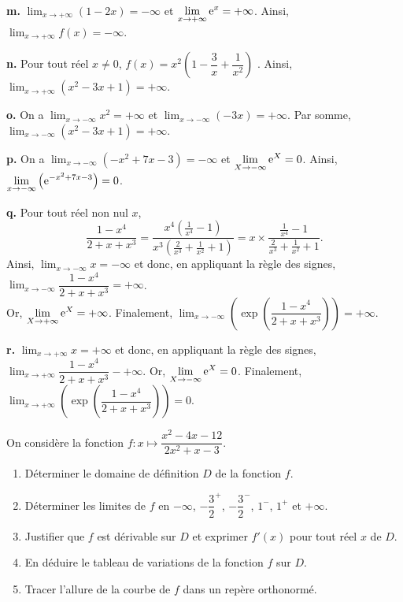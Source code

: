 \documentclass[11pt,fleqn, openany]{book} %
\begin{document}
\begin{solution}
\textbf{m.} $\displaystyle \lim_{x \to +\infty}(1-2x)=-\infty$ et $\displaystyle \lim_{x \to +\infty} \mathrm{e}^x =+\infty$. Ainsi, $\displaystyle \lim_{x \to +\infty} f(x)=-\infty$.

\textbf{n.} Pour tout réel $x\neq 0$, $f(x)=x^2\left(1-\dfrac{3}{x}+\dfrac{1}{x^2}\right)$ . Ainsi, $\displaystyle \lim_{x \to +\infty} \left( x^2-3x+1\right)=+\infty$.

\textbf{o.} On a $\displaystyle\lim_{x \to -\infty}x^2=+\infty$ et $\displaystyle\lim_{x \to -\infty}(-3x)=+\infty$. Par somme, $\displaystyle \lim_{x \to -\infty} \left( x^2-3x+1\right)=+\infty$.

\textbf{p.} On a $\displaystyle \lim_{x \to -\infty} (-x^2+7x-3)=-\infty$ et $\displaystyle \lim_{X \to -\infty} \mathrm{e}^X=0$. Ainsi, $\displaystyle \lim_{x \to -\infty}\left( \mathrm{e}^{-x^2+7x-3}\right)=0$.

\textbf{q.} Pour tout réel non nul $x$, 
\[\dfrac{1-x^4}{2+x+x^3}=\dfrac{x^4\left(\frac{1}{x^4}-1\right)}{x^3\left(\frac{2}{x^3}+\frac{1}{x^2}+1\right)}=x \times \dfrac{\frac{1}{x^4}-1}{\frac{2}{x^3}+\frac{1}{x^2}+1}.\]
Ainsi,  $\displaystyle \lim_{x \to -\infty} x=-\infty$ et donc, en appliquant la règle des signes, $\displaystyle \lim_{x \to -\infty}\dfrac{1-x^4}{2+x+x^3}=+\infty$. \\ Or, $\displaystyle \lim_{X \to +\infty} \mathrm{e}^X=+\infty$. Finalement, $\displaystyle \lim_{x \to -\infty}\left( \exp\left( \dfrac{1-x^4}{2+x+x^3}\right)\right)=+\infty$.

\textbf{r.} $\displaystyle \lim_{x \to +\infty} x=+\infty$ et donc, en appliquant la règle des signes, $\displaystyle \lim_{x \to +\infty}\dfrac{1-x^4}{2+x+x^3}-+\infty$. Or, $\displaystyle \lim_{X \to -\infty} \mathrm{e}^X=0$. Finalement, $\displaystyle \lim_{x \to +\infty}\left( \exp\left( \dfrac{1-x^4}{2+x+x^3}\right)\right)=0$.
\end{solution}





\begin{exercise}[topic=lim22]On considère la fonction $f:x\mapsto \dfrac{x^2-4x-12}{2x^2+x-3}$.
\begin{enumerate}
\item Déterminer le domaine de définition $D$ de la fonction $f$.
\item Déterminer les limites de $f$ en $-\infty$, $-\dfrac{3}{2}^+$, $-\dfrac{3}{2}^-$, $1^-$, $1^+$ et $+\infty$.
\item Justifier que $f$ est dérivable sur $D$ et exprimer $f'(x)$ pour tout réel $x$ de $D$.
\item En déduire le tableau de variations de la fonction $f$ sur $D$.
\item Tracer l'allure de la courbe de $f$ dans un repère orthonormé.
\end{enumerate}\end{exercise}
\end{document}

